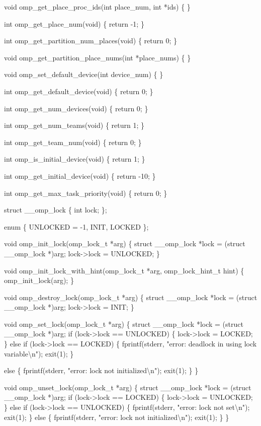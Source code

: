 {\begin{codepar}
void omp\_get\_place\_proc\_ids(int place\_num, int *ids)
\{
\}

int omp\_get\_place\_num(void)
\{
    return -1;
\}

int omp\_get\_partition\_num\_places(void)
\{
    return 0;
\}

void omp\_get\_partition\_place\_nums(int *place\_nums)
\{
\}

void omp\_set\_default\_device(int device\_num)
\{
\}

int omp\_get\_default\_device(void)
\{
    return 0;
\}

int omp\_get\_num\_devices(void)
\{
    return 0;
\}

int omp\_get\_num\_teams(void)
\{
    return 1;
\}

int omp\_get\_team\_num(void)
\{
    return 0;
\}

int omp\_is\_initial\_device(void)
\{
    return 1;
\}

int omp\_get\_initial\_device(void)
\{
    return -10;
\}

int omp\_get\_max\_task\_priority(void)
\{
    return 0;
\}

struct \_\_omp\_lock
\{
    int lock;
\};

enum \{ UNLOCKED = -1, INIT, LOCKED \};

void omp\_init\_lock(omp\_lock\_t *arg)
\{
    struct \_\_omp\_lock *lock = (struct \_\_omp\_lock *)arg;
    lock->lock = UNLOCKED;
\}

void omp\_init\_lock\_with\_hint(omp\_lock\_t *arg, omp\_lock\_hint\_t hint)
\{
    omp\_init\_lock(arg);
\}

void omp\_destroy\_lock(omp\_lock\_t *arg)
\{
    struct \_\_omp\_lock *lock = (struct \_\_omp\_lock *)arg;
    lock->lock = INIT;
\}

void omp\_set\_lock(omp\_lock\_t *arg)
\{
    struct \_\_omp\_lock *lock = (struct \_\_omp\_lock *)arg;
    if (lock->lock == UNLOCKED)
    \{
        lock->lock = LOCKED;
    \}
    else if (lock->lock == LOCKED)
    \{
        fprintf(stderr, "error: deadlock in using lock variable{\textbackslash}n");
        exit(1);
    \}

    else
    \{
        fprintf(stderr, "error: lock not initialized{\textbackslash}n");
        exit(1);
    \}
\}

void omp\_unset\_lock(omp\_lock\_t *arg)
\{
struct \_\_omp\_lock *lock = (struct \_\_omp\_lock *)arg;
    if (lock->lock == LOCKED)
    \{
        lock->lock = UNLOCKED;
    \}
    else if (lock->lock == UNLOCKED)
    \{
        fprintf(stderr, "error: lock not set{\textbackslash}n");
        exit(1);
    \}
    else
    \{
        fprintf(stderr, "error: lock not initialized{\textbackslash}n");
        exit(1);
    \}
\}


\end{codepar}}
